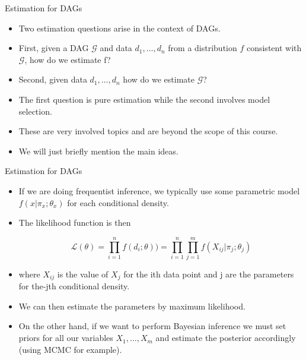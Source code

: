 \documentclass[handout]{beamer}
\begin{document}
\begin{frame}{Estimation for DAGs}
\scriptsize{
\begin{itemize}
\item Two estimation questions arise in the context of DAGs. 
\item First, given a DAG $\mathcal{G}$ and data $d_1,\dots,d_n$ from a distribution $f$ consistent with $\mathcal{G}$, how do we estimate f?

\item Second, given data $d_1,\dots,d_n$ how do we estimate $\mathcal{G}$?

\item The first question is pure estimation while the second involves model selection.

\item These are very involved topics and are beyond the scope of this course.

\item We will just briefly mention the main ideas.

 
\end{itemize}



} 

\end{frame}


\begin{frame}{Estimation for DAGs}
\scriptsize{
\begin{itemize}

\item If we are doing frequentist inference, we typically use some parametric model $f(x|\pi_x;\theta_x)$ for each conditional density. 

\item The likelihood function is then

\begin{displaymath}
 \mathcal{L}(\theta) = \prod_{i=1}^nf(d_i;\theta) ) =  \prod_{i=1}^n\prod_{j=1}^mf(X_{ij}|\pi_j;\theta_j) 
\end{displaymath}

\item where $X_{ij}$ is the value of $X_j$ for the ith data point and j are the parameters for the-jth conditional density. 

\item We can then estimate the parameters by maximum likelihood.

\item On the other hand, if we want to perform Bayesian inference we must set priors for all our variables $X_1,\dots,X_m$ and estimate the posterior accordingly (using MCMC for example).

 
\end{itemize}



} 

\end{frame}
\end{document}
